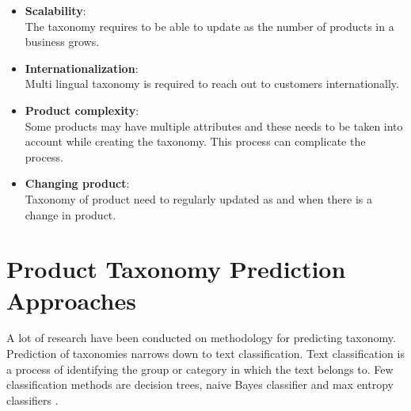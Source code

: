 \begin{enumerate}[label=\textbf{Q\arabic*:}]
    \begin{itemize}
        \item \textbf{Scalability}:\\ The taxonomy requires to be able to update as the number of products in a business grows.
        \item \textbf{Internationalization}:\\ Multi lingual taxonomy is required to reach out to customers internationally. 
        \item \textbf{Product complexity}:\\  Some products may have multiple attributes and these needs to be taken into account while creating the taxonomy. This process can complicate the process.
        \item \textbf{Changing product}:\\ Taxonomy of product need to regularly updated as and when there is a change in product. 
    \end{itemize}

\end{enumerate}

\section{Product Taxonomy Prediction Approaches}


A lot of research have been conducted on methodology for predicting taxonomy. Prediction of taxonomies narrows down to text classification. Text classification is a process of identifying the group or category in which the  text belongs to.  Few classification methods are decision trees, naive Bayes classifier and max entropy classifiers \parencite{BirdKleinLoper09}. 


